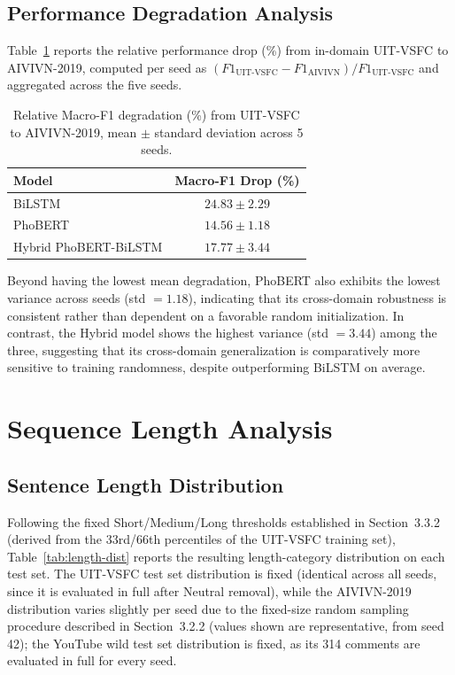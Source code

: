\documentclass[12pt]{report} %
\begin{document}
\subsection{Performance Degradation Analysis}
Table~\ref{tab:degradation-aivivn} reports the relative performance drop (\%) from in-domain UIT-VSFC to AIVIVN-2019, computed per seed as $(F1_{\text{UIT-VSFC}} - F1_{\text{AIVIVN}}) / F1_{\text{UIT-VSFC}}$ and aggregated across the five seeds.

\begin{table}[htbp]
    \centering
    \caption{Relative Macro-F1 degradation (\%) from UIT-VSFC to AIVIVN-2019, mean $\pm$ standard deviation across 5 seeds.}
    \label{tab:degradation-aivivn}
    \begin{tabular}{lc}
        \hline
        \textbf{Model}        & \textbf{Macro-F1 Drop (\%)} \\
        \hline
        BiLSTM                & $24.83 \pm 2.29$            \\
        PhoBERT               & $\mathbf{14.56 \pm 1.18}$   \\
        Hybrid PhoBERT-BiLSTM & $17.77 \pm 3.44$            \\
        \hline
    \end{tabular}
\end{table}

Beyond having the lowest mean degradation, PhoBERT also exhibits the lowest variance across seeds (std $= 1.18$), indicating that its cross-domain robustness is consistent rather than dependent on a favorable random initialization. In contrast, the Hybrid model shows the highest variance (std $= 3.44$) among the three, suggesting that its cross-domain generalization is comparatively more sensitive to training randomness, despite outperforming BiLSTM on average.

\section{Sequence Length Analysis}

\subsection{Sentence Length Distribution}
Following the fixed Short/Medium/Long thresholds established in Section~3.3.2 (derived from the 33rd/66th percentiles of the UIT-VSFC training set), Table~\ref{tab:length-dist} reports the resulting length-category distribution on each test set. The UIT-VSFC test set distribution is fixed (identical across all seeds, since it is evaluated in full after Neutral removal), while the AIVIVN-2019 distribution varies slightly per seed due to the fixed-size random sampling procedure described in Section~3.2.2 (values shown are representative, from seed 42); the YouTube wild test set distribution is fixed, as its 314 comments are evaluated in full for every seed.
\end{document}
